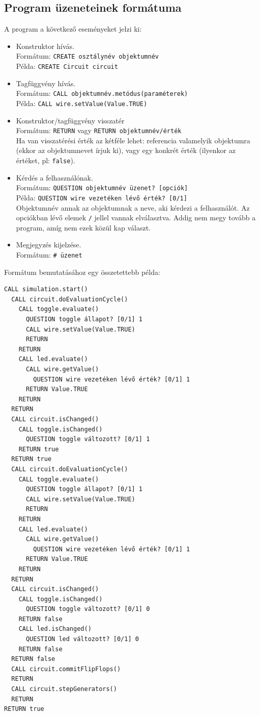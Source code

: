 \subsection{Program üzeneteinek formátuma}

A program a következő eseményeket jelzi ki:
\begin{itemize}
\item Konstruktor hívás.\\
	  Formátum: \texttt{CREATE osztálynév objektumnév}\\
	  Példa: \texttt{CREATE Circuit circuit}
\item Tagfüggvény hívás.\\
	  Formátum: \texttt{CALL objektumnév.metódus(paraméterek)}\\
	  Példa: \texttt{CALL wire.setValue(Value.TRUE)}
\item Konstruktor/tagfüggvény visszatér\\
	  Formátum: \texttt{RETURN} vagy \texttt{RETURN objektumnév/érték}\\
	  Ha van visszatérési érték az kétféle lehet: referencia valamelyik objektumra (ekkor az objektumnevet írjuk ki), vagy egy konkrét érték (ilyenkor az értéket, pl: \texttt{false}).
\item Kérdés a felhasználónak.\\
	  Formátum: \texttt{QUESTION objektumnév üzenet? [opciók]}\\
	  Példa: \texttt{QUESTION wire vezetéken lévő érték? [0/1]}\\
	  Objektumnév annak az objektumnak a neve, aki kérdezi a felhasználót. Az opciókban lévő elemek \texttt{/} jellel vannak elválasztva. Addig nem megy tovább a program, amíg nem ezek közül kap választ.
\item Megjegyzés kijelzése.\\
	Formátum: \texttt{\# üzenet}
\end{itemize}

Formátum bemutatásához egy összetettebb példa:

\begin{verbatim}
CALL simulation.start()
  CALL circuit.doEvaluationCycle()
    CALL toggle.evaluate()
      QUESTION toggle állapot? [0/1] 1
      CALL wire.setValue(Value.TRUE)
      RETURN
    RETURN
    CALL led.evaluate()
      CALL wire.getValue()
        QUESTION wire vezetéken lévő érték? [0/1] 1
      RETURN Value.TRUE
    RETURN
  RETURN
  CALL circuit.isChanged()
    CALL toggle.isChanged()
      QUESTION toggle változott? [0/1] 1
    RETURN true
  RETURN true
  CALL circuit.doEvaluationCycle()
    CALL toggle.evaluate()
      QUESTION toggle állapot? [0/1] 1
      CALL wire.setValue(Value.TRUE)
      RETURN
    RETURN
    CALL led.evaluate()
      CALL wire.getValue()
        QUESTION wire vezetéken lévő érték? [0/1] 1
      RETURN Value.TRUE
    RETURN
  RETURN
  CALL circuit.isChanged()
    CALL toggle.isChanged()
      QUESTION toggle változott? [0/1] 0
    RETURN false
    CALL led.isChanged()
      QUESTION led változott? [0/1] 0
    RETURN false
  RETURN false
  CALL circuit.commitFlipFlops()
  RETURN
  CALL circuit.stepGenerators()
  RETURN
RETURN true
\end{verbatim}

